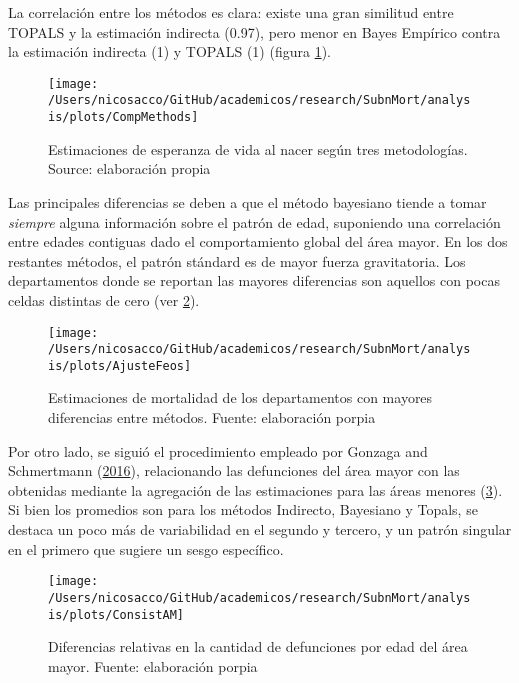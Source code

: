 \documentclass[12pt,]{article}
\begin{document}
La correlación entre los métodos es clara: existe una gran similitud
entre TOPALS y la estimación indirecta (0.97), pero menor en Bayes
Empírico contra la estimación indirecta (1) y TOPALS (1) (figura
\ref{fig:comparativeMeth}).

\begin{figure}

{\centering \texttt{[image: /Users/nicosacco/GitHub/academicos/research/SubnMort/analysis/plots/CompMethods]} 

}

\caption{Estimaciones de esperanza de vida al nacer según tres metodologías. Source: elaboración propia}\label{fig:comparativeMeth}
\end{figure}

Las principales diferencias se deben a que el método bayesiano tiende a
tomar \emph{siempre} alguna información sobre el patrón de edad,
suponiendo una correlación entre edades contiguas dado el comportamiento
global del área mayor. En los dos restantes métodos, el patrón stándard
es de mayor fuerza gravitatoria. Los departamentos donde se reportan las
mayores diferencias son aquellos con pocas celdas distintas de cero (ver
\ref{fig:Feos}).

\begin{figure}

{\centering \texttt{[image: /Users/nicosacco/GitHub/academicos/research/SubnMort/analysis/plots/AjusteFeos]} 

}

\caption{Estimaciones de mortalidad de los departamentos con mayores diferencias entre métodos. Fuente: elaboración porpia}\label{fig:Feos}
\end{figure}

Por otro lado, se siguió el procedimiento empleado por Gonzaga and
Schmertmann (\protect\hyperlink{ref-Gonzaga_Schmertmann_2016}{2016}),
relacionando las defunciones del área mayor con las obtenidas mediante
la agregación de las estimaciones para las áreas menores
(\ref{fig:consistAM}). Si bien los promedios son para los métodos
Indirecto, Bayesiano y Topals, se destaca un poco más de variabilidad en
el segundo y tercero, y un patrón singular en el primero que sugiere un
sesgo específico.

\begin{figure}

{\centering \texttt{[image: /Users/nicosacco/GitHub/academicos/research/SubnMort/analysis/plots/ConsistAM]} 

}

\caption{Diferencias relativas en la cantidad de defunciones por edad del área mayor. Fuente: elaboración porpia}\label{fig:consistAM}
\end{figure}
\end{document}
